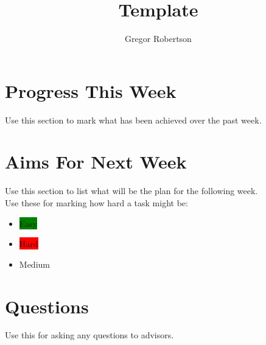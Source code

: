\documentclass{article}
\title{Template}
\author{Gregor Robertson}
\date{}
\begin{document}
 
\maketitle
 
\section*{Progress This Week}
Use this section to mark what has been achieved over the past week.

\section*{Aims For Next Week}
Use this section to list what will be the plan for the following week.\\
Use these for marking how hard a task might be:
\begin{itemize}
	\item \colorbox{Green}{\color{Black}Easy}
	\item \colorbox{Red}{\color{Black}Hard}
	\item \colorbox{BurntOrange}{\color{Black}Medium}
\end{itemize}

\section*{Questions}
Use this for asking any questions to advisors.

\medskip
 
\printbibliography
\end{document}
